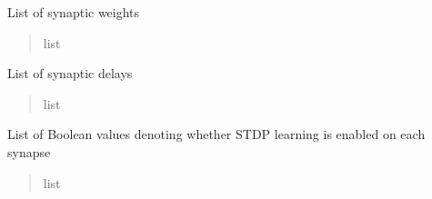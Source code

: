 \documentclass[letterpaper,10pt,english]{sphinxmanual}
\begin{document}
\begin{fulllineitems}
\begin{fulllineitems}
\begin{quote}
\begin{description}
\end{description}\end{quote}

\end{fulllineitems}


\begin{fulllineitems}
\label{\detokenize{index:superneuromat.SNN.synaptic_weights}}
\pysigstartsignatures
\pysigline
{}
\pysigstopsignatures
\sphinxAtStartPar
List of synaptic weights
\begin{quote}\begin{description}
\sphinxAtStartPar
list

\end{description}\end{quote}

\end{fulllineitems}


\begin{fulllineitems}
\label{\detokenize{index:superneuromat.SNN.synaptic_delays}}
\pysigstartsignatures
\pysigline
{}
\pysigstopsignatures
\sphinxAtStartPar
List of synaptic delays
\begin{quote}\begin{description}
\sphinxAtStartPar
list

\end{description}\end{quote}

\end{fulllineitems}


\begin{fulllineitems}
\label{\detokenize{index:superneuromat.SNN.enable_stdp}}
\pysigstartsignatures
\pysigline
{}
\pysigstopsignatures
\sphinxAtStartPar
List of Boolean values denoting whether STDP learning is enabled on each synapse
\begin{quote}\begin{description}
\sphinxAtStartPar
list


\end{description}
\end{quote}
\end{fulllineitems}
\end{fulllineitems}
\end{document}
